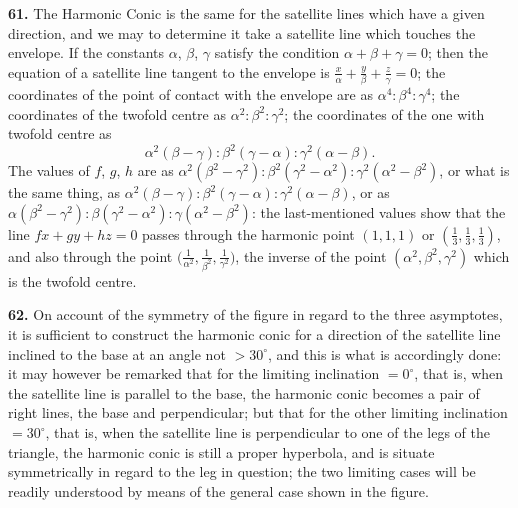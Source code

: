 \documentclass[11pt,a4paper]{article}
\begin{document}
\textbf{61.} The Harmonic Conic is the same for the satellite lines which have a given direction, and we may to determine it take a satellite line which touches the envelope. If the constants $\alpha$, $\beta$, $\gamma$ satisfy the condition $\alpha+\beta+\gamma=0$; then the equation of a satellite line tangent to the envelope is $\tfrac{x}{\alpha}+\tfrac{y}{\beta}+\tfrac{z}{\gamma}=0$; the coordinates of the point of contact with the envelope are as $\alpha^{4}:\beta^{4}:\gamma^{4}$; the coordinates of the twofold centre as $\alpha^{2}:\beta^{2}:\gamma^{2}$; the coordinates of the one with twofold centre as
\[
\alpha^{2}(\beta-\gamma):\beta^{2}(\gamma-\alpha):\gamma^{2}(\alpha-\beta).
\]
The values of $f$, $g$, $h$ are as $\alpha^{2}(\beta^{2}-\gamma^{2}):\beta^{2}(\gamma^{2}-\alpha^{2}):\gamma^{2}(\alpha^{2}-\beta^{2})$, or what is the same thing, as $\alpha^{2}(\beta-\gamma):\beta^{2}(\gamma-\alpha):\gamma^{2}(\alpha-\beta)$, or as $\alpha(\beta^{2}-\gamma^{2}):\beta(\gamma^{2}-\alpha^{2}):\gamma(\alpha^{2}-\beta^{2})$: the last-mentioned values show that the line $f x + g y + h z = 0$ passes through the harmonic point $(1,1,1)$ or $(\tfrac{1}{3},\tfrac{1}{3},\tfrac{1}{3})$, and also through the point $\bigl(\tfrac{1}{\alpha^{2}},\tfrac{1}{\beta^{2}},\tfrac{1}{\gamma^{2}}\bigr)$, the inverse of the point $(\alpha^{2},\beta^{2},\gamma^{2})$ which is the twofold centre.

\medskip

\textbf{62.} On account of the symmetry of the figure in regard to the three asymptotes, it is sufficient to construct the harmonic conic for a direction of the satellite line inclined to the base at an angle not $>30^{\circ}$, and this is what is accordingly done: it may however be remarked that for the limiting inclination $=0^{\circ}$, that is, when the satellite line is parallel to the base, the harmonic conic becomes a pair of right lines, the base and perpendicular; but that for the other limiting inclination $=30^{\circ}$, that is, when the satellite line is perpendicular to one of the legs of the triangle, the harmonic conic is still a proper hyperbola, and is situate symmetrically in regard to the leg in question; the two limiting cases will be readily understood by means of the general case shown in the figure.

\medskip
\end{document}
